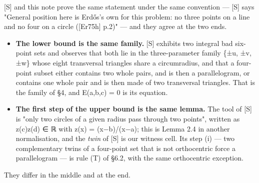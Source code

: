 \documentclass[11pt,a4paper]{article}
\theoremstyle{named}
\begin{document}
[S] and this note prove the same statement under the same convention — [S] says "General position here is Erdős's own for this problem: no three points on a line and no four on a circle ([Er75h] p.2)" — and they agree at the two ends.

\begin{itemize}[leftmargin=1.4em,itemsep=.2em,topsep=.3em]
\item \textbf{The lower bound is the same family.} [S] exhibits two integral bad six-point sets and observes that both lie in the three-parameter family \{±u, ±v, ±w\} whose eight transversal triangles share a circumradius, and that a four-point subset either contains two whole pairs, and is then a parallelogram, or contains one whole pair and is then made of two transversal triangles. That is the family of §4, and E(a,b,c) = 0 is its equation.
\item \textbf{The first step of the upper bound is the same lemma.} The tool of [S] is "only two circles of a given radius pass through two points", written as z(c)z(d) ∈ ℝ with z(x) = (x−b)/(x−a); this is Lemma 2.4 in another normalisation, and the \textit{twin} of [S] is our witness cell. Its step (i) — two complementary twins of a four-point set that is not orthocentric force a parallelogram — is rule (T) of §6.2, with the same orthocentric exception.
\end{itemize}

They differ in the middle and at the end.
\end{document}
